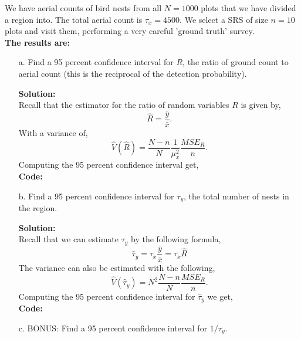 \documentclass[12pt]{article}
\makeatletter
\theoremstyle{homework}
\newenvironment{exercise}[1]
{\def\@currentlabel{#1}\exercisecore}
{\endexercisecore}
\newcommand{\localhead}[1]{\par\smallskip\noindent\textbf{#1}\nobreak\\}%
\newcommand\solution{\localhead{Solution:}}
\makeatother
\begin{document}
\begin{exercise}{1} We have aerial counts of bird nests from all $N = 1000$ plots that we 
have divided a region into. The total aerial count is $\tau_x = 4500$. We select a SRS of
size $n = 10$ plots and visit them, performing a very careful 'ground truth' survey.\\

\textbf{The results are:}
\begin{center}
   
\end{center}

\begin{enumerate}
  \item[a.] Find a 95 percent confidence interval for $R$, the ratio of ground count to aerial
   count (this is the reciprocal of the detection probability).\\
   \solution Recall that the estimator for the ratio of random variables $R$ is given by, 
   \begin{equation*}
     \hat{R} = \dfrac{\bar{y}}{\bar{x}}.
   \end{equation*}
   With a variance of, 
   \begin{equation*}
    \hat{V}(\hat{R}) = \dfrac{N - n}{N}\dfrac{1}{\mu^2_x}\dfrac{MSE_R}{n}.
   \end{equation*}
   Computing the 95 percent confidence interval get, \\
   \textbf{Code:}
    \begin{center}
   
    \end{center}
    \vspace{.15in}

  \item[b.] Find a 95 percent confidence interval for $\tau_y$, the total number of nests in the region.\\
  \solution Recall that we can estimate $\tau_y$ by the following formula, 
  \begin{equation*}
    \hat{\tau}_y = \tau_x \dfrac{\bar{y}}{\bar{x}} = \tau_x \hat{R}
  \end{equation*}
  The variance can also be estimated with the following, 
  \begin{equation*}
    \hat{V}( \hat{\tau}_y) = N^2\dfrac{N - n}{N}\dfrac{MSE_R}{n}.
  \end{equation*}
  Computing the 95 percent confidence interval for $\hat{\tau}_y$ we get, \\
  \textbf{Code:}
  \begin{center}
 
  \end{center}
  \vspace{.15in}

   \item[c.] BONUS: Find a 95 percent confidence interval for $1/\tau_y$.

\end{enumerate}
\end{exercise}
\end{document}
